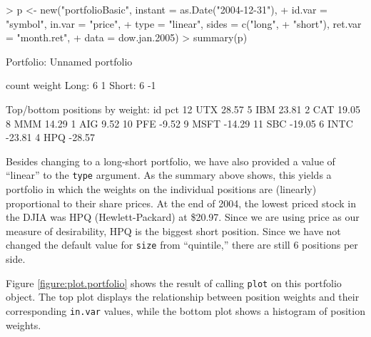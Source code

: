 \documentclass[a4paper]{report}
\begin{document}
\begin{article}
\begin{Schunk}
\begin{Sinput}
> p <- new("portfolioBasic", instant = as.Date("2004-12-31"), 
+     id.var = "symbol", in.var = "price", 
+     type = "linear", sides = c("long", 
+         "short"), ret.var = "month.ret", 
+     data = dow.jan.2005)
> summary(p)
\end{Sinput}
\begin{Soutput}
Portfolio: Unnamed portfolio

        count       weight
Long:       6            1 
Short:      6           -1 

Top/bottom positions by weight:
     id    pct
12  UTX  28.57
5   IBM  23.81
2   CAT  19.05
8   MMM  14.29
1   AIG   9.52
10  PFE  -9.52
9  MSFT -14.29
11  SBC -19.05
6  INTC -23.81
4   HPQ -28.57
\end{Soutput}
\end{Schunk}

Besides changing to a long-short portfolio, we have also provided a
value of ``linear'' to the \texttt{type} argument. As the summary
above shows, this yields a portfolio in which the weights on the
individual positions are (linearly) proportional to their share
prices. At the end of 2004, the lowest priced stock in the DJIA was
HPQ (Hewlett-Packard) at \$20.97. Since we are using price as our
measure of desirability, HPQ is the biggest short position. Since we
have not changed the default value for \texttt{size} from
``quintile,'' there are still 6 positions per side.

Figure \ref{figure:plot.portfolio} shows the result of calling
\texttt{plot} on this portfolio object.  The top plot displays the
relationship between position weights and their corresponding
\texttt{in.var} values, while the bottom plot shows a histogram of
position weights.


\end{article}
\end{document}
